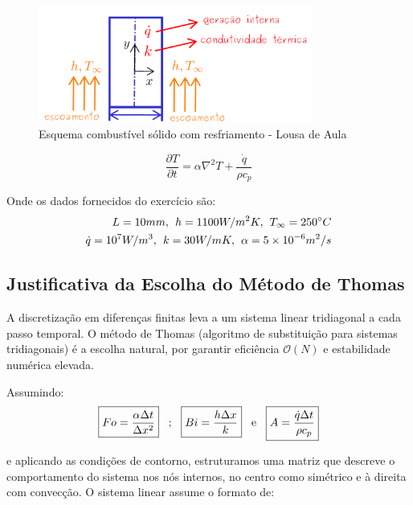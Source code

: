 \documentclass[12pt]{article}
\begin{document}
\begin{figure}[H]
    \centering
    \includegraphics[width=0.8\textwidth]{img/figure2.png}
    \caption{Esquema combustível sólido com resfriamento - Lousa de Aula}
\end{figure}

\[
\frac{\partial T}{\partial t} = \alpha \nabla^2T + \frac{\dot{q}}{\rho c_p}
\]

Onde os dados fornecidos do exercício são:
\begin{align*}
    L = 10 mm , \hspace*{0.15cm} h = 1100 W/m^2 K , \hspace*{0.15cm} T_\infty=250^{\circ} C \\
    \dot{q}=10^7 W/m^3 , \hspace*{0.15cm} k=30 W/m K , \hspace*{0.15cm} \alpha = 5 \times 10^{-6} m^2/s
\end{align*}


\subsection{Justificativa da Escolha do Método de Thomas}

A discretização em diferenças finitas leva a um sistema linear tridiagonal a cada passo temporal. O método de Thomas (algoritmo de substituição para sistemas tridiagonais) é a escolha natural, por garantir eficiência \(\mathcal{O}(N)\) e estabilidade numérica elevada.

Assumindo:
\[
\boxed{Fo = \frac{\alpha \Delta t}{\Delta x^2}} \hspace*{0.3cm}
\text{;} \hspace*{0.3cm}
\boxed{Bi = \frac{h \Delta x}{k}} \hspace*{0.3cm}
\text{e} \hspace*{0.3cm}
\boxed{A = \frac{\dot{q} \Delta t}{\rho c_p}}
\]

e aplicando as condições de contorno, estruturamos uma matriz que descreve o comportamento do sistema nos nós internos, no centro como simétrico e à direita com convecção. O sistema linear assume o formato de:
\end{document}
